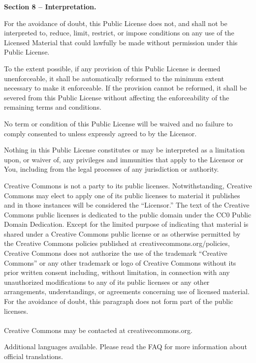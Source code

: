 \par \textbf{Section 8 – Interpretation.}
\begin{doclicense@enumerate}
\item For the avoidance of doubt, this Public License does not, and shall not be interpreted to, reduce, limit, restrict, or impose conditions on any use of the Licensed Material that could lawfully be made without permission under this Public License.
\item To the extent possible, if any provision of this Public License is deemed unenforceable, it shall be automatically reformed to the minimum extent necessary to make it enforceable. If the provision cannot be reformed, it shall be severed from this Public License without affecting the enforceability of the remaining terms and conditions.
\item No term or condition of this Public License will be waived and no failure to comply consented to unless expressly agreed to by the Licensor.
\item Nothing in this Public License constitutes or may be interpreted as a limitation upon, or waiver of, any privileges and immunities that apply to the Licensor or You, including from the legal processes of any jurisdiction or authority.
\end{doclicense@enumerate}

\par Creative Commons is not a party to its public licenses. Notwithstanding, Creative Commons may elect to apply one of its public licenses to material it publishes and in those instances will be considered the “Licensor.” The text of the Creative Commons public licenses is dedicated to the public domain under the CC0 Public Domain Dedication. Except for the limited purpose of indicating that material is shared under a Creative Commons public license or as otherwise permitted by the Creative Commons policies published at creativecommons.org/policies, Creative Commons does not authorize the use of the trademark “Creative Commons” or any other trademark or logo of Creative Commons without its prior written consent including, without limitation, in connection with any unauthorized modifications to any of its public licenses or any other arrangements, understandings, or agreements concerning use of licensed material. For the avoidance of doubt, this paragraph does not form part of the public licenses.\\\\
Creative Commons may be contacted at creativecommons.org.
\par Additional languages available. Please read the FAQ for more information about official translations.


